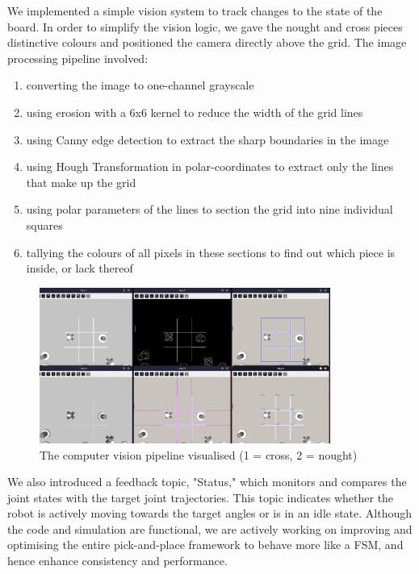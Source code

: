 \documentclass{article}
\begin{document}
We implemented a simple vision system to track changes to the state of the board. In order to simplify the vision logic, we gave the nought and cross pieces distinctive colours and positioned the camera directly above the grid. The image processing pipeline involved:

\begin{enumerate}
    \item converting the image to one-channel grayscale
    \item using erosion with a 6x6 kernel to reduce the width of the grid lines
    \item using Canny edge detection to extract the sharp boundaries in the image
    \item using Hough Transformation in polar-coordinates to extract only the lines that make up the grid
    \item using polar parameters of the lines to section the grid into nine individual squares
    \item tallying the colours of all pixels in these sections to find out which piece is inside, or lack thereof
\end{enumerate}

\begin{figure}[h]
    \centering\includegraphics[width=0.85\textwidth]{vision}
    \caption{The computer vision pipeline visualised (1 = cross, 2 = nought)}
\end{figure}

We also introduced a feedback topic, "Status," which monitors and compares the joint states with the target joint trajectories. This topic indicates whether the robot is actively moving towards the target angles or is in an idle state. Although the code and simulation are functional, we are actively working on improving and optimising the entire pick-and-place framework to behave more like a FSM, and hence enhance consistency and performance.
\end{document}
